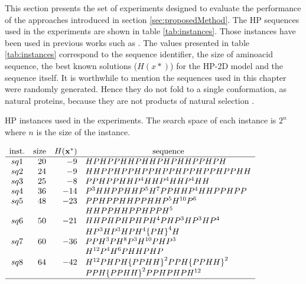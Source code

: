 This section presents the set of experiments designed to evaluate the performance of the approaches introduced in section \ref{sec:proposedMethod}. The HP sequences used in the experiments are shown in table \ref{tab:instances}. Those instances have been used in previous works such as \cite{bastolla1997testing,shmygelska2002ant,unger1993genetic,cotta2003protein, santana2004protein,shmygelska2003improved,lesh2003complete}. The values presented in table \ref{tab:instances} correspond to the sequence identifier, the size of aminoacid sequence, the best known solutions ($H(x*)$) for the HP-2D model and the sequence itself. It is worthwhile to mention the sequences used in this chapter were randomly generated. Hence they do not fold to a single conformation, as natural proteins, because they are not products of natural selection \cite{chan2001perspectives}.

\begin{table}[]
	\begin{center}
		\caption{HP instances used in the experiments. The search space of each instance is $2^n$ where $n$ is the size of
			the instance.}
		\label{tab:instances}
		{$\begin{array}{c r r l}
			\text{inst.} & \text{size} &  \multicolumn{1}{ c }{H({\bf{x}}^*)} & \multicolumn{1}{c}{\text{sequence}} \\ \hline
			sq1 &20 &-9 & HPHPPHHPHHPHPHHPPHPH \\
			sq2 &24 &-9 & HHPPHPPHPPHPPHPPHPPHPPHH \\
			sq3 &25 &-8 & PPHPPHHP^4HHP^4HHP^4HH \\
			sq4 &36 &-14 &  P^3HHPPHHP^5H^7PPHHP^4HHPPHPP\\
			sq5 &48 &-23 &  PPHPPHHPPHHP^5H^{10}P^6 \\
			&   &    &  HHPPHHPPHPPH^5 \\
			sq6 &50 &-21 &  HHPHPHPHPH^4PHP^3HP^3HP^4 \\
			&   &    & HP^3HP^3HPH^4{\{PH\}}^4H\\
			sq7 &60 &-36 &  PPH^3PH^8P^3H^{10}PHP^3\\
			&   &    &  H^{12}P^4H^6PHHPHP\\
			sq8 &64 &-42 &   H^{12}PHPH{\{PPHH\}}^2PPH{\{PPHH\}}^2\\
			&   &    &  PPH{\{PPHH\}}^2PPHPHPH^{12}\\
			\hline
			\end{array}$}
	\end{center}
\end{table}

